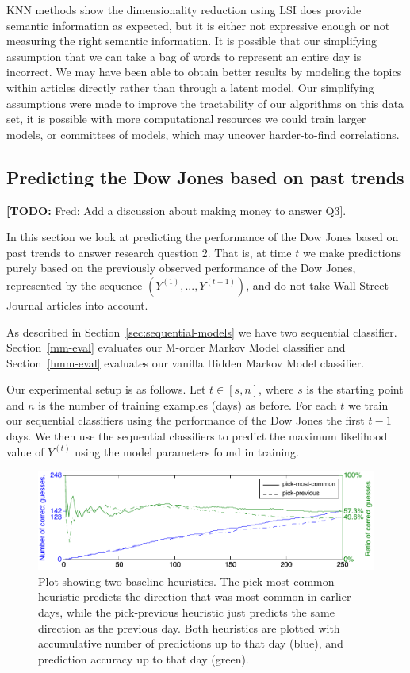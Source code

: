 \documentclass[10pt, twocolumn]{article}
\def\TODO#1{\noindent\textbf{[TODO:} #1]}
\begin{document}
KNN methods show the dimensionality reduction using LSI does provide semantic information as expected, but it is either not expressive enough or not measuring the right semantic information. It is possible that our simplifying assumption that we can take a bag of words to represent an entire day is incorrect. We may have been able to obtain better results by modeling the topics within articles directly rather than through a latent model. Our simplifying assumptions were made to improve the tractability of our algorithms on this data set, it is possible with more computational resources we could train larger models, or committees of models, which may uncover harder-to-find correlations.


\subsection{Predicting the Dow Jones based on past trends}
\label{dj->dj}

\TODO{Fred: Add a discussion about making money to answer Q3}.

In this section we look at predicting the performance of the Dow Jones based on past trends to answer research question 2.
That is, at time $t$ we make predictions purely based on the previously observed performance of the Dow Jones, represented by the sequence $(Y^{(1)}, ..., Y^{(t-1)})$, and do not take Wall Street Journal articles into account.

As described in Section~\ref{sec:sequential-models} we have two sequential classifier.
Section~\ref{mm-eval} evaluates our M-order Markov Model classifier and Section~\ref{hmm-eval} evaluates our vanilla Hidden Markov Model classifier.

Our experimental setup is as follows.
Let $t\in{}[s,n]$, where $s$ is the starting point and $n$ is the number of training examples (days) as before.
For each $t$ we train our sequential classifiers using the performance of the Dow Jones the first $t-1$ days.
We then use the sequential classifiers to predict the maximum likelihood value of $Y^{(t)}$ using the model parameters found in training.

\begin{figure}[t]
\center
\hspace{0.5cm}
\includegraphics[width=16cm]{experiments/seq_baseline.pdf}
\caption{Plot showing two baseline heuristics. The pick-most-common heuristic predicts the direction that was most common in earlier days, while the pick-previous heuristic just predicts the same direction as the previous day. Both heuristics are plotted with accumulative number of predictions up to that day (blue), and prediction accuracy up to that day (green).}
\label{fig:seq-baseline}
\end{figure}
\end{document}
